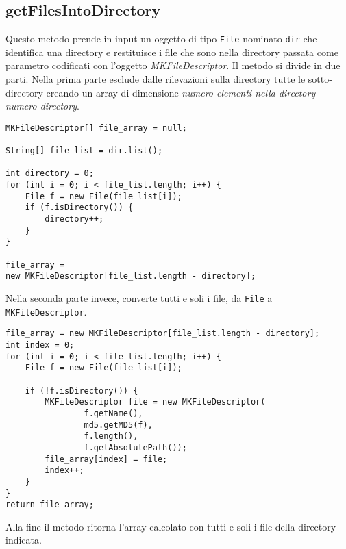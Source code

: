 \subsection{getFilesIntoDirectory}
Questo metodo prende in input un oggetto di tipo \verb|File| nominato \verb|dir| che identifica una directory e restituisce i file che sono nella directory passata come parametro codificati con l'oggetto \emph{MKFileDescriptor}.
Il metodo si divide in due parti. Nella prima parte esclude dalle rilevazioni sulla directory tutte le sotto-directory creando un array di dimensione \emph{numero elementi nella directory - numero directory}.
\begin{lstlisting}
MKFileDescriptor[] file_array = null;

String[] file_list = dir.list();

int directory = 0;
for (int i = 0; i < file_list.length; i++) {
	File f = new File(file_list[i]);
	if (f.isDirectory()) {
		directory++;
	}
}

file_array = 
new MKFileDescriptor[file_list.length - directory];
\end{lstlisting}
Nella seconda parte invece, converte tutti e soli i file, da \verb|File| a \verb|MKFileDescriptor|.
\begin{lstlisting}
file_array = new MKFileDescriptor[file_list.length - directory];
int index = 0;
for (int i = 0; i < file_list.length; i++) {
	File f = new File(file_list[i]);

	if (!f.isDirectory()) {
		MKFileDescriptor file = new MKFileDescriptor(
				f.getName(),
				md5.getMD5(f),
				f.length(),
				f.getAbsolutePath());
		file_array[index] = file;
		index++;
	}
}
return file_array;
\end{lstlisting}
Alla fine il metodo ritorna l'array calcolato con tutti e soli i file della directory indicata.

